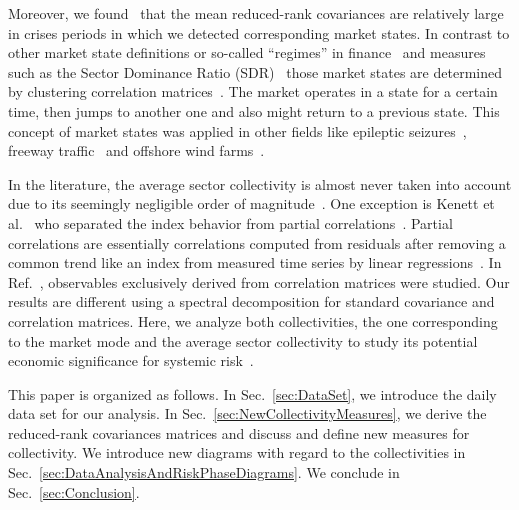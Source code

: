 \documentclass[aps, pra, groupedaddress, showkeys, twocolumn, floatfix, 10pt]{revtex4-2}
\begin{document}
Moreover, we found~\cite{Heckens_2022} that the mean reduced-rank covariances are relatively large in crises periods
in which we detected corresponding market states.
In contrast to other market state definitions or so-called ``regimes'' in finance~\cite{Hamilton_1989,Marsili_2002,Procacci_2019} and measures such as the Sector Dominance Ratio (SDR)~\cite{Uechi_2015}
those market states are determined by clustering correlation
matrices~\cite{munnixIdentifyingStatesFinancial2012,Stepanov_2015,Rinn_2015,Chetalova_2015,Chetalova_2015_2,Stepanov_2015_MultiAsset,papenbrockHandlingRiskonRiskoff2015,jurczyk2017measuring,Pharasi_2018,Qiu_2018,pharasi2020market,pharasi2020dynamics,Heckens_2020,pharasi2021dynamics,marti2021review,Heckens_2022}.
The market operates in a state for a certain time, then jumps to
another one and also might return to a previous state.  This concept
of market states was applied in other fields like epileptic
seizures~\cite{rings2019traceability}, freeway
traffic~\cite{Wang_2020} and offshore wind
farms~\cite{bette2021nonstationarity}.

In the literature, the average sector collectivity is almost never taken into
account due to its seemingly negligible order of
magnitude~\cite{Borghesi_2007}.  One exception is Kenett et al.~\cite{kenett2011index} who separated the index
behavior from partial
correlations~\cite{shapira2009index,kenett2010dominating,Kenett_2015}. 
Partial correlations are essentially correlations computed from residuals after removing a common trend like an index from measured time series by linear regressions~\cite{anderson2003introduction,wiki:2021:PartialCorr}.
In Ref.~\cite{kenett2011index}, observables exclusively derived from correlation matrices were studied.
Our results are different using a spectral decomposition for standard covariance and correlation matrices.
Here, we analyze both collectivities, the one corresponding to the market mode and the average sector collectivity to study its potential economic significance for systemic risk~\cite{kritzman2011principal,Bisias_2012,zheng2012changes,Billio_2012,beguvsic2018information,Huang_2013,Musmeci_2016}.


This paper is organized as follows.
In Sec.~\ref{sec:DataSet}, we introduce the daily data set for our analysis. 
In Sec.~\ref{sec:NewCollectivityMeasures}, we derive the reduced-rank covariances matrices and discuss and define new measures for collectivity. We introduce new diagrams with regard to the collectivities in Sec.~\ref{sec:DataAnalysisAndRiskPhaseDiagrams}. 
We conclude in Sec.~\ref{sec:Conclusion}.
\end{document}

